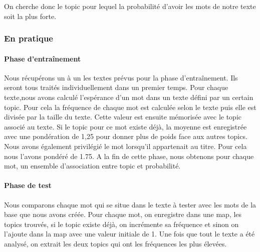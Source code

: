 On cherche donc le topic pour lequel la probabilité d'avoir les mots de notre texte soit la plus forte.


\subsubsection{En pratique}
\paragraph{Phase d'entraînement}  Nous récupérons un à un les textes prévus pour la phase d'entraînement. Ils seront tous traités individuellement dans un premier temps. Pour chaque texte,nous avons calculé l'espérance d'un mot dans un texte défini par un certain topic. Pour cela la fréquence de chaque mot est calculée selon le texte puis elle est divisée par la taille du texte. Cette valeur est ensuite mémorisée avec le topic associé au texte. Si le topic pour ce mot existe déjà, la moyenne est enregistrée avec une pondération de 1,25 pour donner plus de poids face aux autres topics. Nous avons également privilégié le mot lorsqu'il appartenait au titre. Pour cela nous l'avons pondéré de 1.75. A la fin de cette phase, nous obtenons pour chaque mot, un ensemble d'association entre topic et probabilité. 


\paragraph{Phase de test}  Nous comparons chaque mot qui se situe dans le texte à tester avec les mots de la base que nous avons créée. Pour chaque mot, on enregistre dans une map, les topics trouvés, si le topic existe déjà, on incrémente sa fréquence et sinon on l'ajoute dans la map avec une valeur initiale de 1. Une fois que tout le texte a été analysé, on extrait les deux topics qui ont les fréquences les plus élevées.
